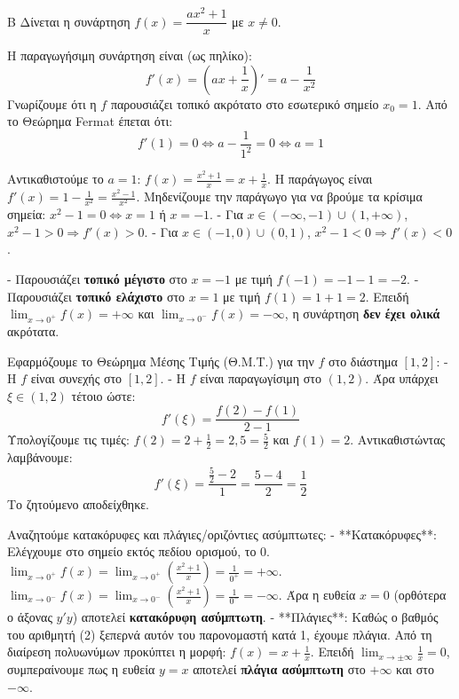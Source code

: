 
\begin{thema}{Β}
Δίνεται η συνάρτηση $f(x) = \dfrac{ax^2+1}{x}$ με $x \ne 0$.
\begin{erwthma}
\item Η παραγωγήσιμη συνάρτηση είναι (ως πηλίκο):
\[ f'(x) = \left(ax + \frac{1}{x}\right)' = a - \frac{1}{x^2} \]
Γνωρίζουμε ότι η $f$ παρουσιάζει τοπικό ακρότατο στο εσωτερικό σημείο $x_0=1$. Από το Θεώρημα Fermat έπεται ότι:
\[ f'(1) = 0 \Leftrightarrow a - \frac{1}{1^2} = 0 \Leftrightarrow a = 1 \]

\item Αντικαθιστούμε το $a=1$: $f(x) = \frac{x^2+1}{x} = x + \frac{1}{x}$.
Η παράγωγος είναι $f'(x) = 1 - \frac{1}{x^2} = \frac{x^2-1}{x^2}$.
Μηδενίζουμε την παράγωγο για να βρούμε τα κρίσιμα σημεία:
$x^2 - 1 = 0 \Leftrightarrow x = 1$ ή $x = -1$.
- Για $x \in (-\infty, -1) \cup (1, +\infty)$, $x^2-1 > 0 \Rightarrow f'(x) > 0$.
- Για $x \in (-1, 0) \cup (0, 1)$, $x^2-1 < 0 \Rightarrow f'(x) < 0$.
\begin{center}
\end{center}
- Παρουσιάζει \textbf{τοπικό μέγιστο} στο $x = -1$ με τιμή $f(-1) = -1 - 1 = -2$.
- Παρουσιάζει \textbf{τοπικό ελάχιστο} στο $x = 1$ με τιμή $f(1) = 1 + 1 = 2$.
Επειδή $\lim_{x\to0^+} f(x) = +\infty$ και $\lim_{x\to0^-} f(x) = -\infty$, η συνάρτηση \textbf{δεν έχει ολικά} ακρότατα.

\item Εφαρμόζουμε το Θεώρημα Μέσης Τιμής (Θ.Μ.Τ.) για την $f$ στο διάστημα $[1, 2]$:
- Η $f$ είναι συνεχής στο $[1, 2]$.
- Η $f$ είναι παραγωγίσιμη στο $(1, 2)$.
Άρα υπάρχει $\xi \in (1, 2)$ τέτοιο ώστε:
\[ f'(\xi) = \frac{f(2) - f(1)}{2 - 1} \]
Υπολογίζουμε τις τιμές: $f(2) = 2 + \frac{1}{2} = 2,5 = \frac{5}{2}$ και $f(1) = 2$.
Αντικαθιστώντας λαμβάνουμε:
\[ f'(\xi) = \frac{\frac{5}{2} - 2}{1} = \frac{5-4}{2} = \frac{1}{2} \]
Το ζητούμενο αποδείχθηκε.

\item Αναζητούμε κατακόρυφες και πλάγιες/οριζόντιες ασύμπτωτες:
- **Κατακόρυφες**: Ελέγχουμε στο σημείο εκτός πεδίου ορισμού, το $0$.
$\lim_{x\to0^+} f(x) = \lim_{x\to0^+} \left( \frac{x^2+1}{x} \right) = \frac{1}{0^+} = +\infty$.
$\lim_{x\to0^-} f(x) = \lim_{x\to0^-} \left( \frac{x^2+1}{x} \right) = \frac{1}{0^-} = -\infty$.
Άρα η ευθεία $x = 0$ (ορθότερα ο άξονας $y'y$) αποτελεί \textbf{κατακόρυφη ασύμπτωτη}.
- **Πλάγιες**: Καθώς ο βαθμός του αριθμητή (2) ξεπερνά αυτόν του παρονομαστή κατά 1, έχουμε πλάγια.
Από τη διαίρεση πολυωνύμων προκύπτει η μορφή: $f(x) = x + \frac{1}{x}$.
Επειδή $\lim_{x\to\pm\infty} \frac{1}{x} = 0$, συμπεραίνουμε πως η ευθεία $y = x$ αποτελεί \textbf{πλάγια ασύμπτωτη} στο $+\infty$ και στο $-\infty$.
\end{erwthma}
\end{thema}
